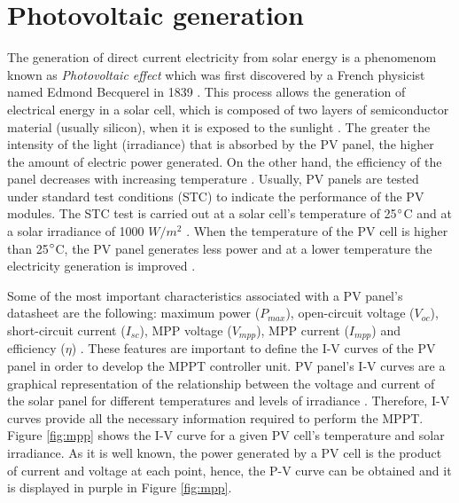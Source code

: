 \section{Photovoltaic generation}

The generation of direct current electricity from solar energy is a phenomenom known as \textit{Photovoltaic effect} which was first discovered by a French physicist named Edmond Becquerel in 1839 \cite{PVeffect}. This process allows the generation of electrical energy in a solar cell, which is composed of two layers of semiconductor material (usually silicon), when it is exposed to the sunlight \cite{PVeffect}. The greater the intensity of the light (irradiance) that is absorbed by the PV panel, the higher the amount of electric power generated. On the other hand, the efficiency of the panel decreases with increasing temperature \cite{handbook}. Usually, PV panels are tested under standard test conditions (STC) to indicate the performance of the PV modules. The STC test is carried out at a solar cell's temperature of 25$\dec$C and at a solar irradiance of 1000 $W/ m^2$ \cite{handbook}. When the temperature of the PV cell is higher than 25$\dec$C, the PV panel generates less power and at a lower temperature the electricity generation is improved \cite{handbook}. %


Some of the most important characteristics associated with a PV panel’s datasheet are the following: maximum power ($P_{max}$), open-circuit voltage ($V_{oc}$), short-circuit current ($I_{sc}$), MPP voltage ($V_{mpp}$), MPP current ($I_{mpp}$) and efficiency ($\eta$) \cite{handbook}.  %
These features are important to define the I-V curves of the PV panel in order to develop the MPPT controller unit. PV panel's I-V curves are a graphical representation of the relationship between the voltage and current of the solar panel for different temperatures and levels of irradiance \cite{IVcurves}. Therefore, I-V curves provide all the necessary information required to perform the MPPT. Figure \ref{fig:mpp} shows the I-V curve for a given PV cell's temperature and solar irradiance. As it is well known, the power generated by a PV cell is the product of current and voltage at each point, hence, the P-V curve can be obtained and it is displayed in purple in Figure \ref{fig:mpp}.  %

